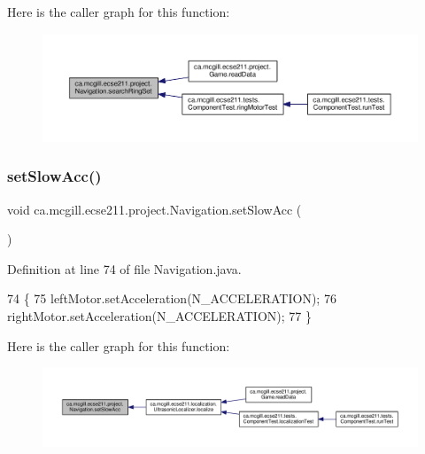 Here is the caller graph for this function\+:
\nopagebreak
\begin{figure}[H]
\begin{center}
\leavevmode
\includegraphics[width=350pt]{classca_1_1mcgill_1_1ecse211_1_1project_1_1_navigation_a1a808e665b8dd5b8e79b0580724d239c_icgraph}
\end{center}
\end{figure}
\mbox{\label{classca_1_1mcgill_1_1ecse211_1_1project_1_1_navigation_ab01db7b8a871acd45e7dd16922abc15e}} 
\subsubsection{\texorpdfstring{set\+Slow\+Acc()}{setSlowAcc()}}
{\footnotesize\ttfamily void ca.\+mcgill.\+ecse211.\+project.\+Navigation.\+set\+Slow\+Acc (\begin{DoxyParamCaption}{ }\end{DoxyParamCaption})}



Definition at line 74 of file Navigation.\+java.


\begin{DoxyCode}
74                            \{
75     leftMotor.setAcceleration(N\_ACCELERATION);
76     rightMotor.setAcceleration(N\_ACCELERATION);
77   \}
\end{DoxyCode}
Here is the caller graph for this function\+:
\nopagebreak
\begin{figure}[H]
\begin{center}
\leavevmode
\includegraphics[width=350pt]{classca_1_1mcgill_1_1ecse211_1_1project_1_1_navigation_ab01db7b8a871acd45e7dd16922abc15e_icgraph}
\end{center}
\end{figure}
\mbox{\label{classca_1_1mcgill_1_1ecse211_1_1project_1_1_navigation_ae8530d181ffd790ff9dea5eeab54b1a1}} 
